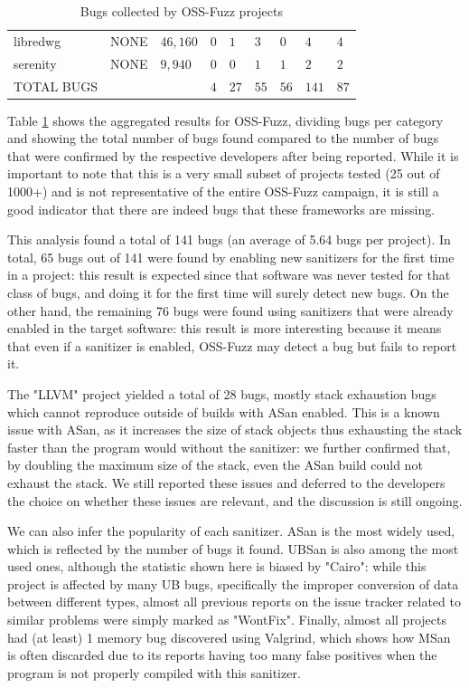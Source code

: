 \begin{table}[h!]
{\begin{tabular}{|l|l|l|l|l|l|l|l|l|}
libredwg         & NONE                & $46,160$            & $0$              & $1$           & $3$           & $0$            & $4$             & $4$                 \\
serenity         & NONE                & $9,940$             & $0$              & $0$           & $1$           & $1$            & $2$             & $2$                 \\
\hline
TOTAL BUGS   &   &   &$4$   &$27$   &$55$   &$56$   &$141$   &$87$       \\
\hline
\end{tabular}}
\vspace{10pt}
\caption{Bugs collected by OSS-Fuzz projects}
\label{ossfuzz-table}
\end{table}
Table \ref{ossfuzz-table} shows the aggregated results for OSS-Fuzz, dividing bugs per category and showing the total number of bugs found compared to the number of bugs that were confirmed by the respective developers after being reported. While it is important to note that this is a very small subset of projects tested (25 out of 1000+) and is not representative of the entire OSS-Fuzz campaign, it is still a good indicator that there are indeed bugs that these frameworks are missing.

This analysis found a total of 141 bugs (an average of 5.64 bugs per project). In total, 65 bugs out of 141 were found by enabling new sanitizers for the first time in a project: this result is expected since that software was never tested for that class of bugs, and doing it for the first time will surely detect new bugs. On the other hand, the remaining 76 bugs were found using sanitizers that were already enabled in the target software: this result is more interesting because it means that even if a sanitizer is enabled, OSS-Fuzz may detect a bug but fails to report it.

The "LLVM" project yielded a total of 28 bugs, mostly stack exhaustion bugs which cannot reproduce outside of builds with ASan enabled. This is a known issue with ASan, as it increases the size of stack objects thus exhausting the stack faster than the program would without the sanitizer: we further confirmed that, by doubling the maximum size of the stack, even the ASan build could not exhaust the stack. We still reported these issues and deferred to the developers the choice on whether these issues are relevant, and the discussion is still ongoing.

We can also infer the popularity of each sanitizer. ASan is the most widely used, which is reflected by the number of bugs it found. UBSan is also among the most used ones, although the statistic shown here is biased by "Cairo": while this project is affected by many UB bugs, specifically the improper conversion of data between different types, almost all previous reports on the issue tracker related to similar problems were simply marked as "WontFix". Finally, almost all projects had (at least) 1 memory bug discovered using Valgrind, which shows how MSan is often discarded due to its reports having too many false positives when the program is not properly compiled with this sanitizer. 



